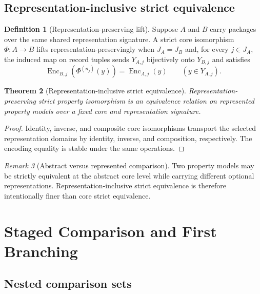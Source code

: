 \documentclass[11pt]{article}
\newcommand{\Enc}{\operatorname{Enc}}
\newtheorem{theorem}{Theorem}[section]
\theoremstyle{definition}
\newtheorem{definition}[theorem]{Definition}
\theoremstyle{remark}
\newtheorem{remark}[theorem]{Remark}
\begin{document}
\subsection{Representation-inclusive strict equivalence}

\begin{definition}[Representation-preserving lift]
Suppose \(A\) and \(B\) carry packages over the same shared representation signature.
A strict core isomorphism \(\Phi:A\to B\) lifts representation-preservingly when \(J_A=J_B\) and, for every \(j\in J_A\), the induced map on record tuples sends \(Y_{A,j}\) bijectively onto \(Y_{B,j}\) and satisfies
\[
\Enc_{B,j}(\Phi^{(n_j)}(y))=\Enc_{A,j}(y)
\qquad
(y\in Y_{A,j}).
\]
\end{definition}

\begin{theorem}[Representation-inclusive strict equivalence]
Representation-preserving strict property isomorphism is an equivalence relation on represented property models over a fixed core and representation signature.
\end{theorem}

\begin{proof}
Identity, inverse, and composite core isomorphisms transport the selected representation domains by identity, inverse, and composition, respectively.
The encoding equality is stable under the same operations.
\end{proof}

\begin{remark}[Abstract versus represented comparison]
Two property models may be strictly equivalent at the abstract core level while carrying different optional representations.
Representation-inclusive strict equivalence is therefore intentionally finer than core strict equivalence.
\end{remark}

\section{Staged Comparison and First Branching}
\label{sec:branching}

\subsection{Nested comparison sets}
\end{document}
